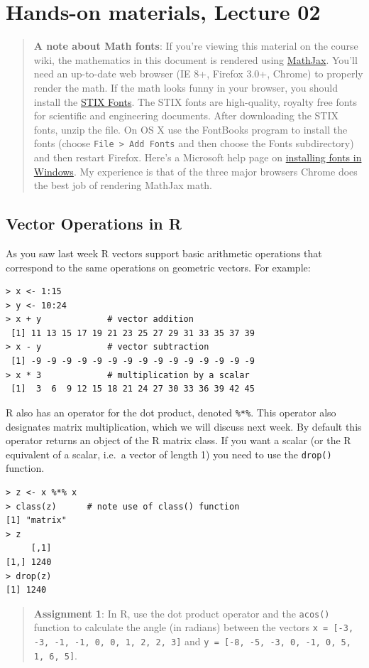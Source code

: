 \documentclass{article}
\begin{document}
\section{Hands-on materials, Lecture 02}

\begin{quote}
\textbf{A note about Math fonts}: If you're viewing this material on the
course wiki, the mathematics in this document is rendered using
\href{http://www.mathjax.org/}{MathJax}. You'll need an up-to-date web
browser (IE 8+, Firefox 3.0+, Chrome) to properly render the math. If
the math looks funny in your browser, you should install the
\href{http://www.stixfonts.org/}{STIX Fonts}. The STIX fonts are
high-quality, royalty free fonts for scientific and engineering
documents. After downloading the STIX fonts, unzip the file. On OS X use
the FontBooks program to install the fonts (choose
\lstinline!File > Add Fonts! and then choose the Fonts subdirectory) and
then restart Firefox. Here's a Microsoft help page on
\href{http://www.microsoft.com/typography/TrueTypeInstall.mspx}{installing
fonts in Windows}. My experience is that of the three major browsers
Chrome does the best job of rendering MathJax math.

\end{quote}
\subsection{Vector Operations in R}

As you saw last week R vectors support basic arithmetic operations that
correspond to the same operations on geometric vectors. For example:

\begin{lstlisting}
> x <- 1:15
> y <- 10:24
> x + y             # vector addition
 [1] 11 13 15 17 19 21 23 25 27 29 31 33 35 37 39
> x - y             # vector subtraction
 [1] -9 -9 -9 -9 -9 -9 -9 -9 -9 -9 -9 -9 -9 -9 -9
> x * 3             # multiplication by a scalar
 [1]  3  6  9 12 15 18 21 24 27 30 33 36 39 42 45 
\end{lstlisting}
R also has an operator for the dot product, denoted \lstinline!%*%!.
This operator also designates matrix multiplication, which we will
discuss next week. By default this operator returns an object of the R
matrix class. If you want a scalar (or the R equivalent of a scalar,
i.e.~a vector of length 1) you need to use the \lstinline!drop()!
function.

\begin{lstlisting}
> z <- x %*% x
> class(z)      # note use of class() function
[1] "matrix"
> z
     [,1]
[1,] 1240
> drop(z)
[1] 1240
\end{lstlisting}
\begin{quote}
\textbf{Assignment 1}: In R, use the dot product operator and the
\lstinline!acos()! function to calculate the angle (in radians) between
the vectors \lstinline!x = [-3, -3, -1, -1, 0, 0, 1, 2, 2, 3]! and
\lstinline!y = [-8, -5, -3, 0, -1, 0, 5, 1, 6, 5]!.

\end{quote}
\end{document}

